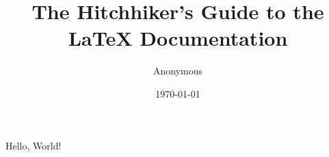 \documentclass{article}
\title{The Hitchhiker's Guide to the \LaTeX{} Documentation}
\author{Anonymous}
\date{\today}
\begin{document}
    \maketitle

    Hello, World!
\end{document}
